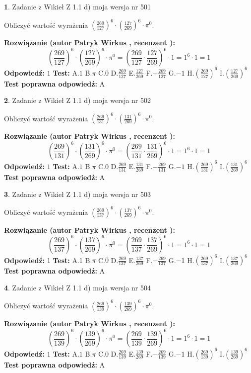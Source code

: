 \documentclass[12pt, a4paper]{article}
\theoremstyle{definition} %
\newtheorem{zad}{}
\newcommand{\zadStart}[1]{\begin{zad}#1\newline}
\newcommand{\zadStop}{\end{zad}}
\newcommand{\rozwStart}[2]{\noindent \textbf{Rozwiązanie (autor #1 , recenzent #2): }\newline}
\newcommand{\rozwStop}{\newline}
\newcommand{\odpStart}{\noindent \textbf{Odpowiedź:}\newline}
\newcommand{\odpStop}{\newline}
\newcommand{\testStart}{\noindent \textbf{Test:}\newline}
\newcommand{\testStop}{\newline}
\newcommand{\kluczStart}{\noindent \textbf{Test poprawna odpowiedź:}\newline}
\newcommand{\kluczStop}{\newline}
\begin{document}
\zadStart{Zadanie z Wikieł Z 1.1 d) moja wersja nr 501}

Obliczyć wartość wyrażenia $(\frac{269}{127})^{6} \cdot (\frac{127}{269})^{6} \cdot \pi^{0}$.
\zadStop
\rozwStart{Patryk Wirkus}{}
$$(\frac{269}{127})^{6} \cdot (\frac{127}{269})^{6} \cdot \pi^{0} = (\frac{269}{127} \cdot \frac{127}{269})^{6} \cdot 1 = 1^{6} \cdot 1 = 1$$
\rozwStop
\odpStart
$1$
\odpStop
\testStart
A.$1$ B.$\pi$ C.$0$ D.$\frac{269}{127}$ E.$\frac{127}{269}$
F.$-\frac{269}{127}$ G.$-1$
H.$(\frac{269}{127})^{6}$
I.$(\frac{127}{269})^{6}$
\testStop
\kluczStart
A
\kluczStop



\zadStart{Zadanie z Wikieł Z 1.1 d) moja wersja nr 502}

Obliczyć wartość wyrażenia $(\frac{269}{131})^{6} \cdot (\frac{131}{269})^{6} \cdot \pi^{0}$.
\zadStop
\rozwStart{Patryk Wirkus}{}
$$(\frac{269}{131})^{6} \cdot (\frac{131}{269})^{6} \cdot \pi^{0} = (\frac{269}{131} \cdot \frac{131}{269})^{6} \cdot 1 = 1^{6} \cdot 1 = 1$$
\rozwStop
\odpStart
$1$
\odpStop
\testStart
A.$1$ B.$\pi$ C.$0$ D.$\frac{269}{131}$ E.$\frac{131}{269}$
F.$-\frac{269}{131}$ G.$-1$
H.$(\frac{269}{131})^{6}$
I.$(\frac{131}{269})^{6}$
\testStop
\kluczStart
A
\kluczStop



\zadStart{Zadanie z Wikieł Z 1.1 d) moja wersja nr 503}

Obliczyć wartość wyrażenia $(\frac{269}{137})^{6} \cdot (\frac{137}{269})^{6} \cdot \pi^{0}$.
\zadStop
\rozwStart{Patryk Wirkus}{}
$$(\frac{269}{137})^{6} \cdot (\frac{137}{269})^{6} \cdot \pi^{0} = (\frac{269}{137} \cdot \frac{137}{269})^{6} \cdot 1 = 1^{6} \cdot 1 = 1$$
\rozwStop
\odpStart
$1$
\odpStop
\testStart
A.$1$ B.$\pi$ C.$0$ D.$\frac{269}{137}$ E.$\frac{137}{269}$
F.$-\frac{269}{137}$ G.$-1$
H.$(\frac{269}{137})^{6}$
I.$(\frac{137}{269})^{6}$
\testStop
\kluczStart
A
\kluczStop



\zadStart{Zadanie z Wikieł Z 1.1 d) moja wersja nr 504}

Obliczyć wartość wyrażenia $(\frac{269}{139})^{6} \cdot (\frac{139}{269})^{6} \cdot \pi^{0}$.
\zadStop
\rozwStart{Patryk Wirkus}{}
$$(\frac{269}{139})^{6} \cdot (\frac{139}{269})^{6} \cdot \pi^{0} = (\frac{269}{139} \cdot \frac{139}{269})^{6} \cdot 1 = 1^{6} \cdot 1 = 1$$
\rozwStop
\odpStart
$1$
\odpStop
\testStart
A.$1$ B.$\pi$ C.$0$ D.$\frac{269}{139}$ E.$\frac{139}{269}$
F.$-\frac{269}{139}$ G.$-1$
H.$(\frac{269}{139})^{6}$
I.$(\frac{139}{269})^{6}$
\testStop
\kluczStart
A
\kluczStop
\end{document}
